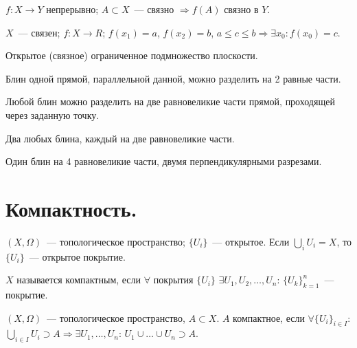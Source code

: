 \documentclass[12pt]{article}
\begin{document}
	\begin{theorem}
		$f: X \rightarrow Y$ непрерывно; $A \subset X$~--- связно $\Rightarrow f(A)$ связно в $Y$.
	\end{theorem}
	
	\begin{theorem}[Вейерштрасса]
		$X$~--- связен; $f: X \rightarrow R$; $f(x_1) = a$, $f(x_2) = b$, $a \leqslant c \leqslant b \Rightarrow \exists x_0: f(x_0) = c$.
	\end{theorem}
	
	\begin{definition}[Блин]
		Открытое (связное) ограниченное подмножество плоскости.
	\end{definition}
	
	\begin{statement}
		Блин одной прямой, параллельной данной, можно разделить на 2 равные части.
	\end{statement}
	
	\begin{statement}
		Любой блин можно разделить на две равновеликие части прямой, проходящей через заданную точку.
	\end{statement}
	
	\begin{statement}
		Два любых блина, каждый на две равновеликие части.
	\end{statement}
	
	\begin{statement}
		Один блин на 4 равновеликие части, двумя перпендикулярными разрезами.
	\end{statement}
	
	\section{Компактность.}
	
	\begin{definition}[Покрытие]
		$(X, \Omega)$~--- топологическое пространство; $\{ U_i \}$~--- открытое. Если $\bigcup\limits_i U_i = X$, то $\{ U_i \}$~--- открытое покрытие.
	\end{definition}
	
	\begin{definition}[Компактность]
		$X$ называется компактным, если $\forall$ покрытия $\{ U_i \}$ $\exists U_1, U_2, \dots, U_n$: $\{ U_k \}_{k = 1}^n$~--- покрытие.
	\end{definition}
	
	\begin{definition}
		$(X, \Omega)$~--- топологическое пространство, $A \subset X$. $A$ компактное, если $\forall \{ U_i \}_{i \in I}$: $\bigcup\limits_{i \in I} U_i \supset A \Rightarrow \exists U_1, \dots, U_n$: $U_1 \cup \dots \cup U_n \supset A$.
	\end{definition}
	
\end{document}
